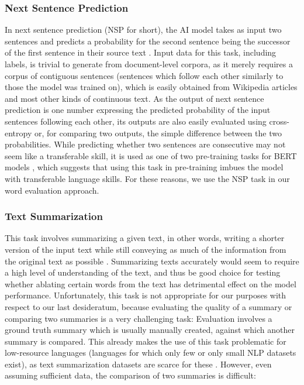 \subsubsection{Next Sentence Prediction} \label{sec:nsp}
In next sentence prediction (NSP for short), the AI model takes as input two sentences and predicts a probability for the second sentence being the successor of the first sentence in their source text \cite{kentonBertPretrainingDeep2019}.
Input data for this task, including labels, is trivial to generate from document-level corpora, as it merely requires a corpus of contiguous sentences (sentences which follow each other similarly to those the model was trained on), which is easily obtained from Wikipedia articles and most other kinds of continuous text.
As the output of next sentence prediction is one number expressing the predicted probability of the input sentences following each other, its outputs are also easily evaluated using cross-entropy or, for comparing two outputs, the simple difference between the two probabilities.
While predicting whether two sentences are consecutive may not seem like a transferable skill, it is used as one of two pre-training tasks for BERT models \cite{kentonBertPretrainingDeep2019}, which suggests that using this task in pre-training imbues the model with transferable language skills.
For these reasons, we use the NSP task in our word evaluation approach.


\subsubsection{Text Summarization} \label{sec:text-summarization}
This task involves summarizing a given text, in other words, writing a shorter version of the input text while still conveying as much of the information from the original text as possible \cite{radevIntroductionSpecialIssue2002}.
Summarizing texts accurately would seem to require a high level of understanding of the text, and thus be good choice for testing whether ablating certain words from the text has detrimental effect on the model performance.
Unfortunately, this task is not appropriate for our purposes with respect to our last desideratum, because evaluating the quality of a summary or comparing two summaries is a very challenging task:
Evaluation involves a ground truth summary which is usually manually created, against which another summary is compared.
This already makes the use of this task problematic for low-resource languages (languages for which only few or only small NLP datasets exist), as text summarization datasets are scarce for these \cite{dahanStateFateSummarization2025}.
However, even assuming sufficient data, the comparison of two summaries is difficult:

